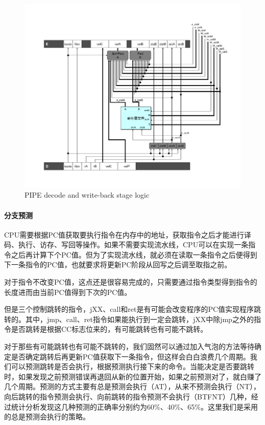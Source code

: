 \documentclass[12pt]{article}
\begin{document}
\begin{CJK*}{GB}{gbsn}
\begin{figure}[htbp]
\centering
\includegraphics{img/pipe-decode.png}
\caption{PIPE decode and write-back stage logic}
\end{figure}

\paragraph{分支预测}\label{ux5206ux652fux9884ux6d4b}

CPU需要根据PC值获取要执行指令在内存中的地址，获取指令之后才能进行译码、执行、访存、写回等操作。如果不需要实现流水线，CPU可以在实现一条指令之后再计算下个PC值。但为了实现流水线，就必须在读取一条指令之后便得到下一条指令的PC值，也就要求将更新PC阶段从回写之后调至取指之前。

对于指令不改变PC值，这点还是很容易完成的，只需要通过指令类型得到指令的长度进而由当前PC值得到下次的PC值。

但是三个控制跳转的指令，jXX、call和ret是有可能会改变程序的PC值实现程序跳转的。其中，jmp、call、ret指令如果能执行到一定会跳转，jXX中除jmp之外的指令是否跳转是根据CC标志位来的，有可能跳转也有可能不跳转。

对于那些有可能跳转也有可能不跳转的，我们固然可以通过加入气泡的方法等待确定是否确定跳转后再更新PC值获取下一条指令，但这样会白白浪费几个周期。我们可以预测跳转是否会执行，根据预测执行接下来的命令。当能决定是否要跳转时，如果发现之前预测错误再退回从新的位置开始，如果之前预测对了，就白赚了几个周期。预测的方式主要有总是预测会执行（AT），从来不预测会执行（NT），向后跳转的指令预测会执行、向前跳转的指令预测不会执行（BTFNT）几种，经过统计分析发现这几种预测的正确率分别约为60\%、40\%、65\%。这里我们是采用的总是预测会执行的策略。


\end{CJK*}
\end{document}

